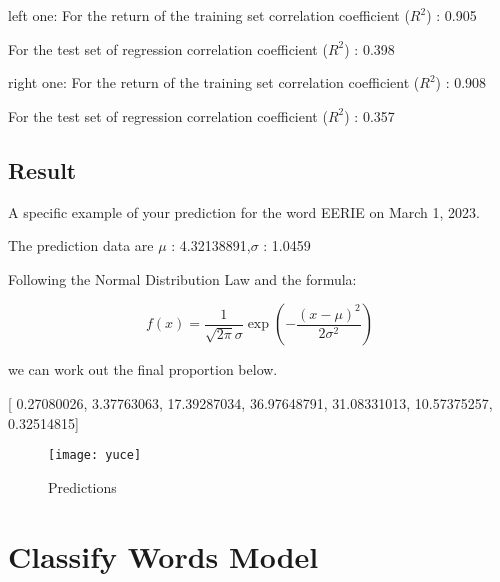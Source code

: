 \documentclass{mcmthesis}
\begin{document}
\begin{figure}[htbp]
\centering    %
\subfigure[Mean] %
{\begin{minipage}{8cm}
\centering          %
\texttt{[image: x]}   %
\end{minipage}
}	
\subfigure [Var] %
{\begin{minipage}{8cm}
\centering      %
\texttt{[image: y]}   %
\end{minipage}
}
\caption{} %
\label{fig:1}  %
\end{figure}


left one: For the return of the training set correlation coefficient ($R^2$) : 0.905 

\hspace*{1.8cm}For the test set of regression correlation coefficient ($R^2$) : 0.398

right one: For the return of the training set correlation coefficient ($R^2$) : 0.908

\hspace*{1.8cm}For the test set of regression correlation coefficient ($R^2$) : 0.357

\subsection{Result} 

\hspace*{0.6cm}A specific example of your prediction for the word EERIE on March 1, 2023. 


The prediction data are $\mu$ : 4.32138891,$\sigma$ : 1.0459

Following the Normal Distribution Law and the formula:

\[f(x)=\frac{1}{\sqrt{2 \pi} \sigma} \exp \left(-\frac{(x-\mu)^2}{2 \sigma^2}\right)\]

we can work out the final proportion below.

[ 0.27080026, 3.37763063, 17.39287034, 36.97648791, 31.08331013, 10.57375257,  0.32514815]


\begin{figure}[h]
\small
\centering
\texttt{[image: yuce]}
\caption{Predictions} \label{fig:aa}
\end{figure}


\section{Classify Words Model}
\end{document}

